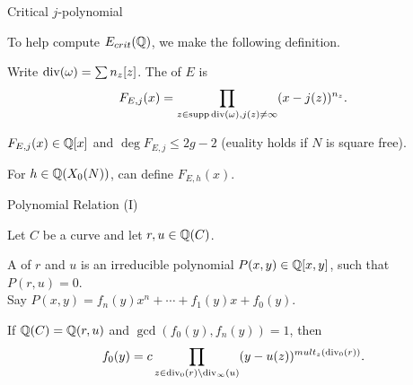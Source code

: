 \documentclass[handout]{beamer}
\begin{document}
\begin{frame}{Critical $j$-polynomial}





To help compute $E_{crit}(\mathbb{Q})$, we make the following definition. 
\begin{Def}
Write $\operatorname{div}(\omega) = \sum n_z[z]$. The  of $E$ is 
\[
F_{E,j}(x) = \prod_{z \in \operatorname{supp} \operatorname{div}(\omega), j(z) \neq \infty}(x-j(z))^{n_z}.
\]
\end{Def}
$F_{E,j}(x) \in \mathbb{Q}[x]$ and $\deg F_{E,j} \leq 2g-2$ (euality holds if $N$ is square free). 

\pause
\smallskip

For $h \in \mathbb{Q}(X_0(N))$, can define $F_{E,h}(x)$. 


\end{frame}


\begin{frame}{Polynomial Relation (I)}

Let $C$ be a curve and let $r, u \in \mathbb{Q}(C)$. 

A  of $r$ and $u$ is an irreducible polynomial $P(x,y) \in \mathbb{Q}[x,y]$, such that $P(r,u) = 0$.  \\

Say $P(x,y) = f_n(y)x^n + \cdots + f_1(y)x + f_0(y)$. 


\begin{Prop}[C.]
\label{mult}
If $\mathbb{Q}(C) = \mathbb{Q}(r,u)$ and $\gcd(f_0(y), f_n(y)) = 1$, then 
\[
		f_0(y) = c \prod_{z \in\operatorname{div}_{0}(r) \setminus \operatorname{div}_{\infty}(u)} (y - u(z))^{mult_z(\operatorname{div}_0(r))}.
\]
\end{Prop}


\end{frame}
\end{document}
